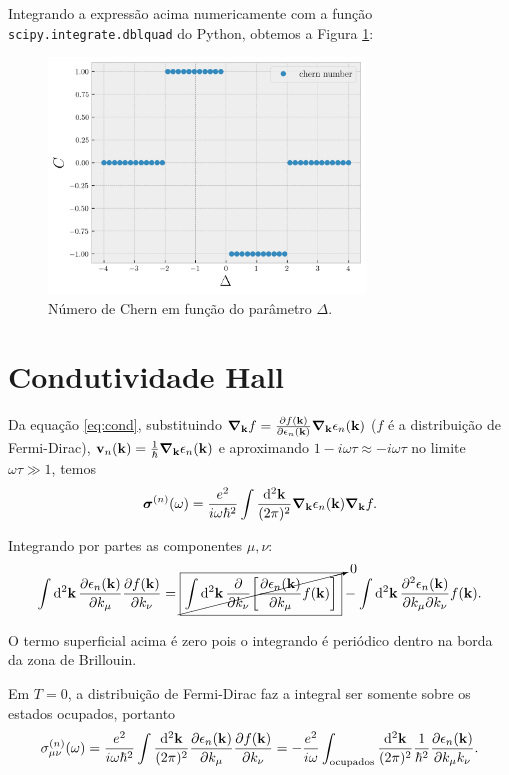 \documentclass[a4paper,10pt]{article}
\begin{document}
Integrando a expressão acima numericamente com a função \texttt{scipy.integrate.dblquad} do Python, obtemos a Figura \ref{fig:chern}:
\begin{figure}[H]
\centering
\includegraphics[width=0.75\textwidth]{fig/chern.png}
\caption{Número de Chern em função do parâmetro $\Delta$.}
\label{fig:chern}
\end{figure}

\pagebreak

\section{Condutividade Hall}

Da equação \ref{eq:cond}, substituindo $\grad_{\vb{k}}f = \pdv{f(\vb{k})}{\epsilon_n(\vb{k})} \grad_{\vb{k}}\epsilon_n(\vb{k})$ ($f$ é a distribuição de Fermi-Dirac), $\vb{v}_n(\vb{k}) = \frac{1}{\hbar} \grad_{\vb{k}}\epsilon_n(\vb{k})$ e aproximando $1-i\omega\tau \approx -i\omega\tau$ no limite $\omega\tau \gg 1$, temos
$$
\bm{\sigma}^{(n)}(\omega) = \frac{e^2}{i\omega \hbar^2}
\int \frac{\dd[2]{\vb{k}}}{(2\pi)^2} \grad_{\vb{k}}\epsilon_n(\vb{k}) \grad_{\vb{k}} f.
$$

 Integrando por partes as componentes $\mu, \nu$:
$$
\int \dd[2]{\vb{k}} \pdv{\epsilon_n(\vb{k})}{k_\mu} \pdv{f(\vb{k})}{k_\nu} =
\cancelto{0}{\boxed{\int \dd[2]{\vb{k}} \pdv{k_\nu} \qty[\pdv{\epsilon_n(\vb{k})}{k_\mu} f(\vb{k})]}} -
\int \dd[2]{\vb{k}} \pdv{\epsilon_n(\vb{k})}{k_\mu}{k_\nu} f(\vb{k}).
$$

O termo superficial acima é zero pois o integrando é periódico dentro na borda da zona de Brillouin.

Em $T=0$, a distribuição de Fermi-Dirac faz a integral ser somente sobre os estados ocupados, portanto
$$
\sigma^{(n)}_{\mu\nu}(\omega) = \frac{e^2}{i\omega \hbar^2}
\int \frac{\dd[2]{\vb{k}}}{(2\pi)^2} \pdv{\epsilon_n(\vb{k})}{k_\mu} \pdv{f(\vb{k})}{k_\nu} =
- \frac{e^2}{i\omega}
\int_{\text{ocupados}} \frac{\dd[2]{\vb{k}}}{(2\pi)^2} \frac{1}{\hbar^2} \pdv{\epsilon_n(\vb{k})}{k_\mu k_\nu}.
$$
\end{document}
